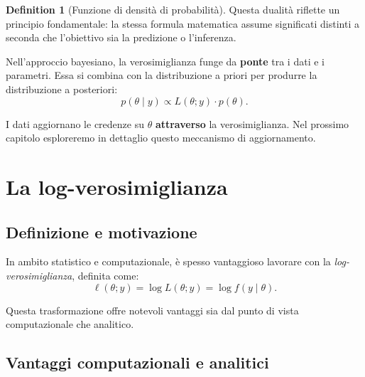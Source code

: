 \documentclass[
  letterpaper,
  DIV=11,
  numbers=noendperiod,
  oneside]{scrreprt}
\theoremstyle{definition}
\theoremstyle{plain}
\theoremstyle{definition}
\newtheorem{definition}{Definition}[chapter]
\theoremstyle{remark}
\begin{document}
\begin{definition}[Funzione di densità di
probabilità]
Questa dualità riflette un principio fondamentale: la stessa formula
matematica assume significati distinti a seconda che l'obiettivo sia la
predizione o l'inferenza.

\begin{tcolorbox}[enhanced jigsaw, arc=.35mm, breakable, colbacktitle=quarto-callout-important-color!10!white, opacityback=0, toprule=.15mm, rightrule=.15mm, colback=white, opacitybacktitle=0.6, leftrule=.75mm, coltitle=black, bottomtitle=1mm, left=2mm, toptitle=1mm, title=\textcolor{quarto-callout-important-color}{\faExclamation}\hspace{0.5em}{Il ruolo della verosimiglianza nell'inferenza bayesiana}, titlerule=0mm, bottomrule=.15mm, colframe=quarto-callout-important-color-frame]

Nell'approccio bayesiano, la verosimiglianza funge da \textbf{ponte} tra
i dati e i parametri. Essa si combina con la distribuzione a priori per
produrre la distribuzione a posteriori: \[
p(\theta \mid y) \propto L(\theta; y) \cdot p(\theta).
\]

I dati aggiornano le credenze su \(\theta\) \textbf{attraverso} la
verosimiglianza. Nel prossimo capitolo esploreremo in dettaglio questo
meccanismo di aggiornamento.

\end{tcolorbox}

\section{La log-verosimiglianza}\label{la-log-verosimiglianza}

\subsection{Definizione e
motivazione}\label{definizione-e-motivazione-1}

In ambito statistico e computazionale, è spesso vantaggioso lavorare con
la \emph{log-verosimiglianza}, definita come: \[
\ell(\theta; y) = \log L(\theta; y) = \log f(y \mid \theta).
\]

Questa trasformazione offre notevoli vantaggi sia dal punto di vista
computazionale che analitico.

\subsection{Vantaggi computazionali e
analitici}\label{vantaggi-computazionali-e-analitici}


\end{definition}
\end{document}
